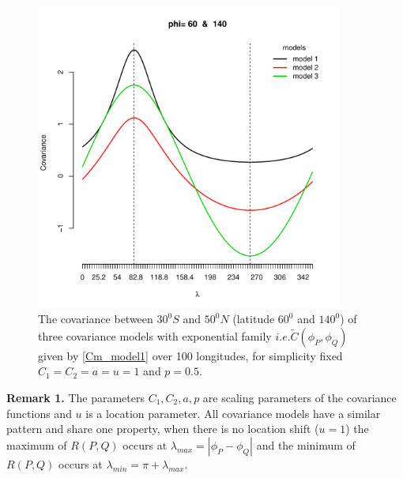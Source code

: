 			\begin{figure}[H]
				\centering
				\includegraphics[width=0.9\textwidth]{graphs/all_covariance_models}
				\caption[The covariance between $30^0S$ and $50^0N$ (latitude $60^0$ and $140^0$) of three covariance models] {The covariance between $30^0S$ and $50^0N$ (latitude $60^0$ and $140^0$) of three covariance models with exponential family $ i.e. \tilde{C}(\phi_P, \phi_Q)$ given by \ref{Cm_model1} over 100 longitudes, for simplicity fixed $C_1 = C_2 = a = u = 1$ and $p = 0.5$.}
			\end{figure}
				
{\bf Remark 1.} The parameters $C_1, C_2, a, p$ are scaling parameters of the covariance functions and $u$ is a location parameter. All covariance models have a similar pattern and share one property, when there is no location shift ($u = 1$) the maximum of $R(P,Q)$ occurs at $\lambda_{max} = |\phi_P -\phi_Q|$ and the minimum of $R(P,Q)$ occurs at $\lambda_{min} = \pi + \lambda_{max}$.  \\
					
